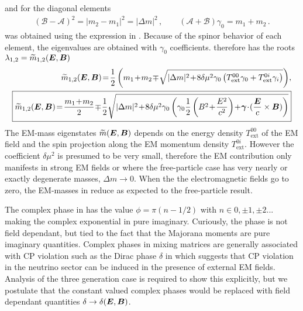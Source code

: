 and for the diagonal elements
\begin{align}
(\mathcal{B}-\mathcal{A})^{2} = |m_{2}-m_{1}|^{2} = |\Delta m|^{2}\,,\qquad (\mathcal{A}+\mathcal{B})\gamma_{0} = m_{1} + m_{2}\,.
\end{align}
 was obtained using the expression in . Because of the spinor behavior of each element, the eigenvalues are obtained with $\gamma_{0}$ coefficients.  therefore has the roots $\lambda_{1,2} = \widetilde m_{1,2}(\boldsymbol{E},\boldsymbol{B})$
\begin{align}
\label{poly:2}
\widetilde m_{1,2}(\bb{E},\bb{B})\! =\! \frac{1}{2}\left(m_{1}\!+\!m_{2}\!\mp\!\sqrt{|\Delta m|^{2}\!+\!8\delta\mu^{2}\gamma_{0}\left(T_\mathrm{ext}^{00}\gamma_{0}+T_\mathrm{ext}^{0i}\gamma_{i}\right)}\right)\!,\\
\label{poly:3}
\boxed{\widetilde m_{1,2}(\bb{E},\bb{B})\! =\! \frac{m_{1}\!+\!m_{2}}{2}\!\mp\!\frac{1}{2}\sqrt{|\Delta m|^{2}\!+\!8\delta\mu^{2}\gamma_{0}\left(\gamma_{0}\frac{1}{2}\left(B^{2}\!+\!\frac{E^{2}}{c^{2}}\right)\!+\!\bb{\gamma}\!\cdot\!(\frac{\bb{E}}{c}\times\bb{B})\right)}}
\end{align}
The EM-mass eigenstates $\widetilde m(\boldsymbol{E},\boldsymbol{B})$ depends on the energy density $T_\mathrm{ext}^{00}$ of the EM field and the spin projection along the EM momentum density $T_\mathrm{ext}^{0i}$. However the coefficient $\delta\mu^{2}$ is presumed to be very small, therefore the EM contribution only manifests in strong EM fields or where the free-particle case has very nearly or exactly degenerate masses, $\Delta m\to 0$. When the the electromagnetic fields go to zero, the EM-masses in  reduce as expected to the free-particle result.

The complex phase in  has the value $\phi=\pi(n-1/2)$ with $n\in0,\pm1,\pm2...$ making the complex exponential in  pure imaginary. Curiously, the phase is not field dependant, but tied to the fact that the Majorana moments are pure imaginary quantities. Complex phases in mixing matrices are generally associated with CP violation such as the Dirac phase $\delta$ in  which suggests that CP violation in the neutrino sector can be induced in the presence of external EM fields. Analysis of the three generation case is required to show this explicitly, but we postulate that the constant valued complex phases would be replaced with field dependant quantities $\delta\to\delta(\boldsymbol{E},\boldsymbol{B})$.

